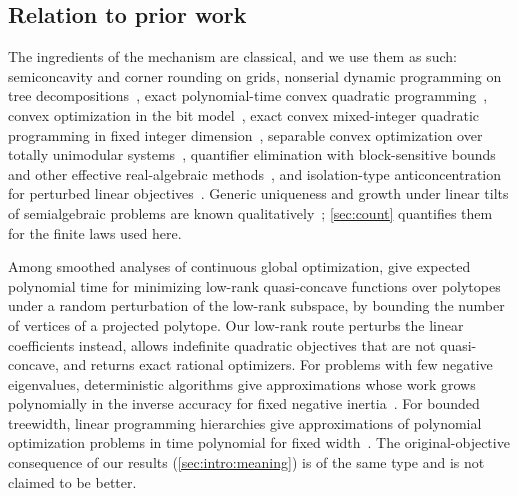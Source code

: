 \subsection{Relation to prior work}\label{sec:intro:prior}

The ingredients of the mechanism are classical, and we use them as such:
semiconcavity and corner rounding on grids, nonserial dynamic programming on
tree decompositions~\citep{bertele1972-nonserial-dynamic-programming}, exact polynomial-time convex
quadratic programming~\citep{kozlov1980-the-polynomial-solvability-of-convex}, convex optimization
in the bit model~\citep{grotschel1988-geometric-algorithms-and-combinatorial-optimization}, exact convex
mixed-integer quadratic programming in fixed integer
dimension~\citep{pia2025-convex-quadratic-sets-and-the}, separable convex optimization over totally
unimodular systems~\citep{hochbaum1990-convex-separable-optimization-is-not}, quantifier elimination
with block-sensitive bounds~\citep{renegar1992-on-the-computational-complexity-and}
and other effective real-algebraic
methods~\citep{basu2006-algorithms-in-real-algebraic-geometry,BasuLerario2023}, and isolation-type
anticoncentration for perturbed linear
objectives~\citep{beier2006-typical-properties-of-winners-and,roglin2007-smoothed-analysis-of-integer-programming}. Generic uniqueness
and growth under linear tilts of semialgebraic problems are known
qualitatively~\citep{lee2017-generic-properties-for-semialgebraic-programs}; \cref{sec:count} quantifies them for the
finite laws used here.

Among smoothed analyses of continuous global optimization,
\citet{kelner2007-on-the-hardness-and-smoothed} give expected polynomial time for minimizing
low-rank quasi-concave functions over polytopes under a random perturbation
of the low-rank subspace, by bounding the number of vertices of a projected
polytope. Our low-rank route perturbs the linear coefficients instead,
allows indefinite quadratic objectives that are not quasi-concave, and
returns exact rational optimizers. For problems with few negative
eigenvalues, deterministic algorithms give approximations whose work grows
polynomially in the inverse accuracy for fixed negative inertia~\citep{vavasis1992-approximation-algorithms-for-indefinite-quadratic}.
For bounded treewidth, linear programming hierarchies give approximations of
polynomial optimization problems in time polynomial for fixed
width~\citep{bienstock2018-lp-formulations-for-polynomial-optimization}. The original-objective consequence of our
results (\cref{sec:intro:meaning}) is of the same type and is not claimed to
be better.

